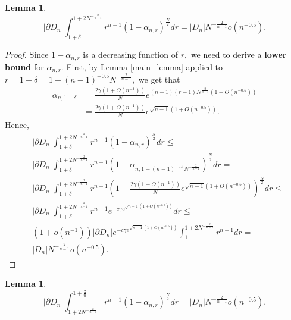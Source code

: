 \documentclass[10pt, twoside, leqno]{article}
\newtheorem{lemma}[thm]{Lemma}
\theoremstyle{definition}
\numberwithin{equation}{section}
\newcommand{\NN}{N^{-\frac 2{n-1} }}
\begin{document}
\begin{lemma}
\[
|\partial D_{n}|\int_{1+\delta}^{1+2\NN}r^{n-1}\left(1-\alpha_{n,r}\right)^{\frac{N}{2}}dr = |D_{n}|\NN o\left(n^{-0.5}\right).
\]
\end{lemma}
\begin{proof}
	Since  $ 1-\alpha_{n,r} $ is a decreasing function of $ r,$  we need to derive a \textbf{lower bound} for $ \alpha_{n,r}.$
First, by Lemma \ref{main_lemma} applied to $ r = {1+\delta}=1+\left(n-1\right)^{-0.5}N^{-\frac{2}{n-1}},$ we get that
\begin{align*}
\alpha_{n,{1+\delta}}&=\frac{2\gamma\left(1+O\left(n^{-1}\right)\right)}{N}e^{\left(n-1\right)\left(r-1\right)N^{\frac{2}{n-1}}\left(1+O\left(n^{-0.5}\right)\right)}\\&=\frac{2\gamma\left(1+O\left(n^{-1}\right)\right)}{N}e^{\sqrt{n-1}\left(1+O\left(n^{-0.5}\right)\right)}.
\end{align*}
Hence,
\begin{equation}
\begin{aligned} & |\partial D_{n}|\int_{1+\delta}^{1+2\NN}r^{n-1}\left(1-\alpha_{n,r}\right)^{\frac{N}{2}}dr\leq\\
& |\partial D_{n}|\int_{1+\delta}^{1+2\NN}r^{n-1}\left(1-\alpha_{n,1+\left(n-1\right)^{-0.5}N^{-\frac{2}{n-1}}}\right)^{\frac{N}{2}}dr=\\
& |\partial D_{n}|\int_{1+\delta}^{1+2\NN}r^{n-1}\left(1-\frac{2\gamma\left(1+O\left(n^{-1}\right)\right)}{N}e^{\sqrt{n-1}\left(1+O\left(n^{-0.5}\right)\right)}\right)^{\frac{N}{2}}dr\leq\\
& |\partial D_{n}|\int_{1+\delta}^{1+2\NN}r^{n-1}e^{-c\gamma e^{\sqrt{n-1}\left(1+O\left(n^{-0.5}\right)\right)}}dr\leq\\
& \left(1+o\left(n^{-1}\right)\right)|\partial D_{n}|e^{-c\gamma e^{\sqrt{n-1}\left(1+O\left(n^{-0.5}\right)\right)}}\int_{1}^{1+2\NN}r^{n-1}dr=\\
& |D_{n}|\NN o\left(n^{-0.5}\right).
\end{aligned}
\end{equation}
\end{proof}
\begin{lemma}
\[
|\partial D_{n}|\int_{1+2\NN}^{1+\frac{2}{n}}r^{n-1}\left(1-\alpha_{n,r}\right)^{\frac{N}{2}}dr = |D_{n}|N^{-\frac{2}{n-1}}o\left(n^{-0.5}\right).
\]
\end{lemma}
\end{document}
